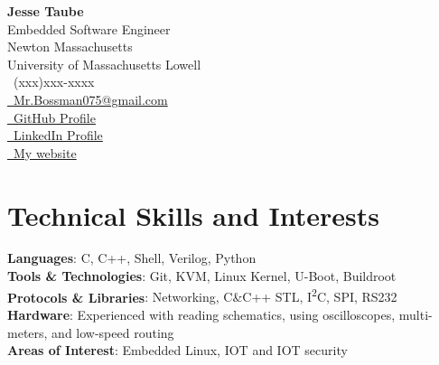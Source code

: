 \documentclass[a4paper,11pt]{article}
\makeatletter
\newcommand{\phone}{(xxx)xxx-xxxx}
\newcommand{\email}{Mr.Bossman075@gmail.com}
\makeatother
\begin{document}
\selectfont
{
\begin{multicols}{2}
	\textbf{\Large Jesse Taube} \\
	{{\footnotesize \faMicrochip} Embedded Software Engineer} \\
	{{\footnotesize \faMapMarker} Newton Massachusetts} \\
	{{\footnotesize \faGraduationCap} University of Massachusetts Lowell} \\
	\vfill\null
	\RaggedLeft
	{\raisebox{0.0\height}{\footnotesize \faPhone}\ \phone} \\
	{\href{mailto:\email}{\raisebox{0.0\height}{\footnotesize \faEnvelope}\ {\email}}} \\
	{\href{https://github.com/Mr-Bossman}{\raisebox{0.0\height}{\footnotesize \faGithub}\ {GitHub Profile}}} \\
	{\href{https://www.linkedin.com/in/jesse-taube-749351229/}{\raisebox{0.0\height}{\footnotesize \faLinkedin}\ {LinkedIn Profile}}} \\
	{\href{https://jachan.dev}{\raisebox{0.0\height}{\footnotesize \faGlobe}\ {My website}}}
\end{multicols}
}
\vspace{-3mm}

\section{\textbf{Technical Skills and Interests}}
\begin{itemize}[leftmargin=0.05in, label={}]
		\small{\item{
		 \textbf{Languages}{: C, C++, Shell, Verilog, Python} \\
		 \textbf{Tools \& Technologies}{: Git, KVM, Linux Kernel, U-Boot, Buildroot } \\
		 \textbf{Protocols \& Libraries}{: Networking, C\&C++ STL, I\textsuperscript{2}C, SPI, RS232}\\
		 \textbf{Hardware}{: Experienced with reading schematics, using oscilloscopes, multi-meters, and low-speed routing} \\
		 \textbf{Areas of Interest}{: Embedded Linux, IOT and IOT security} \\
		}}
\end{itemize}
\vspace{-16pt}
\end{document}

